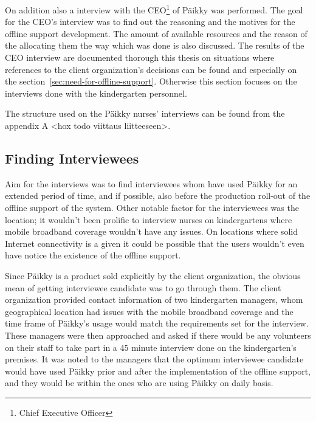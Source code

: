 On addition also a interview with the CEO\footnote{Chief Executive Officer} of Päikky was performed. The goal for the CEO's interview was to find out the reasoning and the motives for the offline support development. The amount of available resources and the reason of the allocating them the way which was done is also discussed. The results of the CEO interview are documented thorough this thesis on situations where references to the client organization's decisions can be found and especially on the section~\ref{sec:need-for-offline-support}. Otherwise this section focuses on the interviews done with the kindergarten personnel.

The structure used on the Päikky nurses' interviews can be found from the appendix A <hox todo viittaus liitteeseen>. %



\subsection{Finding Interviewees}

Aim for the interviews was to find interviewees whom have used Päikky for an extended period of time, and if possible, also before the production roll-out of the offline support of the system. Other notable factor for the interviewees was the location; it wouldn't been prolific to interview nurses on kindergartens where mobile broadband coverage wouldn't have any issues. On locations where solid Internet connectivity is a given it could be possible that the users wouldn't even have notice the existence of the offline support.

Since Päikky is a product sold explicitly by the client organization, the obvious mean of getting interviewee candidate was to go through them. The client organization provided contact information of two kindergarten managers, whom geographical location had issues with the mobile broadband coverage and the time frame of Päikky's usage would match the requirements set for the interview. These managers were then approached and asked if there would be any volunteers on their staff to take part in a 45 minute interview done on the kindergarten's premises. It was noted to the managers that the optimum interviewee candidate would have used Päikky prior and after the implementation of the offline support, and they would be within the ones who are using Päikky on daily basis.


